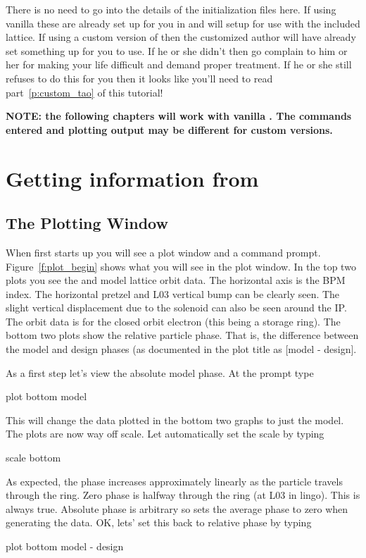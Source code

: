 There is no need to go into the details of the initialization files here. If
using vanilla \tao these are already set up for you in  and will
setup \tao for use with the included \cesr lattice. If
using a custom version of \tao then the customized \tao author will have already set something
up for you to use. If he or she didn't then go complain to him or her for making
your life difficult and demand proper treatment. If he or she still refuses to
do this for you then it looks like you'll need to read part~\ref{p:custom_tao}
of this tutorial!

\textbf{NOTE: the following chapters will work with vanilla \tao. The commands
entered and plotting output may be different for custom versions.}


\section{Getting information from \tao}
\label{s:get_info}

\subsection{The Plotting Window}

When \tao first starts up you will see a plot window and a command prompt. 
Figure~\ref{f:plot_begin} shows what you will see in the plot window. In the top
two plots you see the  and  model lattice orbit data. The horizontal
axis is the \cesr BPM index. The horizontal pretzel and L03 vertical bump can be clearly 
seen. The slight vertical displacement due to the solenoid can also be seen around 
the IP. The orbit data is for the closed orbit electron (this being a storage
ring). The bottom two plots show the relative 
particle phase. That is, the difference
between the model and design phases (as documented in the plot title as [model -
design]. 

As a first step let's view the absolute model phase. At the  prompt type
\begin{example}
  plot bottom model
\end{example}
This will change the data plotted in the bottom two graphs to just the model.
The plots are now way off scale. Let \tao automatically set the scale by typing
\begin{example}
  scale bottom
\end{example}
As expected, the phase increases approximately linearly as the particle travels
through the ring. Zero phase is halfway through the ring (at L03 in \cesr lingo).
This is always true. Absolute phase is arbitrary so \tao sets the average
phase to zero when generating the data. OK, lets' set this back to relative
phase by typing
\begin{example}
  plot bottom model - design
\end{example}



